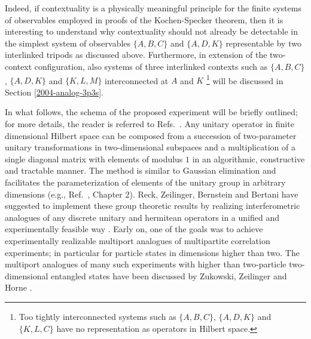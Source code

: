 \documentclass[pra,preprint,showpacs,showkeys,amsfonts]{revtex4}
\begin{document}
Indeed, if contextuality is a physically meaningful principle
for the finite systems of observables employed in proofs of the Kochen-Specker theorem,
then it is interesting to understand why contextuality should not already be
detectable in the simplest system of observables
$\{A,B,C\}$
and
$\{A,D,K\}$
representable by two interlinked tripods as discussed above.
Furthermore, in extension of the two-context configuration,
also systems of three interlinked contexts such as
$\{A,B,C\}$,
$\{A,D,K\}$
and
$\{K,L,M\}$ interconnected at $A$ and $K$
\footnote{
Too tightly interconnected systems such as
$\{A,B,C\}$,
$\{A,D,K\}$
and
$\{K,L,C\}$
have no representation as operators in Hilbert space.
}  will be discussed in Section  \ref{2004-analog-3p3s}.


In what follows, the schema of the proposed experiment will be briefly outlined;
for more details, the reader is referred to Refs.~\cite{rzbb,zukowski-97}.
Any unitary operator in finite dimensional Hilbert space
can be composed from a succession of two-parameter unitary transformations in
two-dimensional subspaces
and a multiplication of a single diagonal matrix with elements of modulus $1$
in an algorithmic, constructive and tractable manner.
The method is similar to Gaussian elimination and facilitates the parameterization of elements
of the unitary group  in arbitrary dimensions (e.g., Ref.~\cite{murnaghan}, Chapter 2).
Reck, Zeilinger, Bernstein and Bertani have suggested to implement
these group theoretic results by realizing interferometric analogues
of any discrete unitary and hermitean operators
in a unified and experimentally feasible way \cite{rzbb,reck-94}.
Early on, one of the goals was to achieve experimentally realizable
multiport analogues of multipartite correlation experiments; in particular
for particle states in dimensions higher than two.
The multiport analogues of many such experiments with higher than
two-particle two-dimensional entangled states have been discussed by
Zukowski, Zeilinger and Horne
\cite{zukowski-97}.
\end{document}
